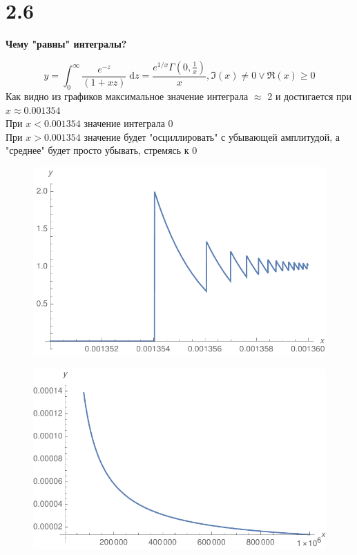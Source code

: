 \documentclass[a4paper,14pt]{article}
\begin{document}
\section*{2.6}

\begin{center}
	\LARGE{\textbf{Чему "равны" интегралы?}}\\
\end{center}

\begin{equation}
y = \int_0^\infty \frac{e^{-z}}{(1 + x z)}\;\mathrm{d}z = \frac{e^{1/x} \Gamma \left(0,\frac{1}{x}\right)}{x},\Im(x)\neq 0\lor \Re(x)\geq 0
\end{equation}
Как видно из графиков максимальное значение интеграла $\approx$ 2 и достигается при $x\approx 0.001354$\\
При $x<0.001354$ значение интеграла 0\\
При $x>0.001354$ значение будет "осциллировать" с убывающей амплитудой, а "среднее" будет просто убывать, стремясь к 0 
\begin{figure}[h]
\includegraphics{gr1}
\end{figure}

\begin{figure}[h]
\includegraphics{gr2}
\end{figure}
\end{document}

